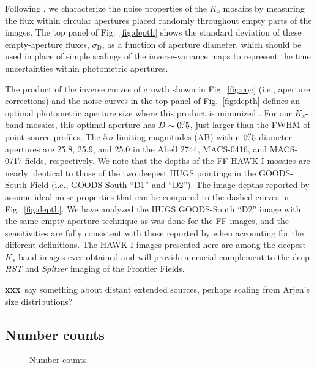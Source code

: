 \documentclass[iop, numberedappendix]{emulateapj}
\gdef\xxx{\textbf{xxx}}
\begin{document}
Following \cite{labbe:03} \citep[see also][]{quadri:musyc, whitaker:nmbs, skelton:14}, we characterize the noise properties of the $K_s$ mosaics by measuring the flux within circular apertures placed randomly throughout empty parts of the images.  The top panel of Fig.~\ref{fig:depth} shows the standard deviation of these empty-aperture fluxes, $\sigma_\mathrm{D}$, as a function of aperture diameter, which should be used in place of simple scalings of the inverse-variance maps to represent the true uncertainties within photometric apertures.  

The product of the inverse curves of growth shown in Fig.~\ref{fig:cog} (i.e., aperture corrections) and the noise curves in the top panel of Fig.~\ref{fig:depth} defines an optimal photometric aperture size where this product is minimized \citep{whitaker:nmbs}.  For our $K_s$-band mosaics, this optimal aperture has $D\sim0\mbox{$.\!\!^{\prime\prime}$}5$, just larger than the FWHM of point-source profiles.  The $5\,\sigma$ limiting magnitudes (AB) within $0\mbox{$.\!\!^{\prime\prime}$}5$ diameter apertures are 25.8, 25.9, and 25.0 in the Abell 2744, MACS-0416, and MACS-0717 fields, respectively.  We note that the depths of the FF HAWK-I mosaics are nearly identical to those of the two deepest HUGS pointings in the GOODS-South Field (i.e., GOODS-South ``D1'' and ``D2'').  The image depths reported by \cite{hugs} assume ideal noise properties that can be compared to the dashed curves in Fig.~\ref{fig:depth}.  We have analyzed the HUGS GOODS-South ``D2'' image with the same empty-aperture technique as was done for the FF images, and the sensitivities are fully consistent with those reported by \cite{hugs} when accounting for the different definitions.  The HAWK-I images presented here are among the deepest $K_s$-band images ever obtained and will provide a crucial complement to the deep \textit{HST} and \textit{Spitzer} imaging of the Frontier Fields.

\xxx\ say something about distant extended sources, perhaps scaling from Arjen's size distributions?

\subsection{Number counts}
\label{s:number}

\begin{figure*}
\caption{Number counts.\label{fig:counts}}  
\end{figure*}
\end{document}
